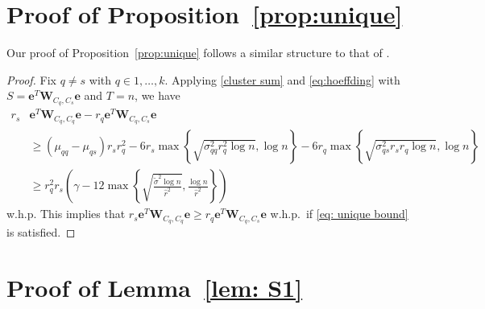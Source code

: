 \documentclass[twoside,11pt]{article}
\newcommand{\e}{\bs {e}}
\newcommand{\bs}{\boldsymbol}
\newcommand{\W}{\bs {W}}
\newcommand{\0}{\bs{0}}
\newcommand{\rbra}[1]{\ensuremath{\left( #1 \right)}} %
\newcommand{\bra}[1]{\ensuremath{\left\{ #1 \right\}}} %
\newcommand{\eq}[1]{\(#1\)}
\begin{document}
\section{Proof of Proposition~\ref{prop:unique}}
\label{A_unique}



Our proof of Proposition~\ref{prop:unique} follows a similar structure to that of \citet[Lemma~4.4]{ames2014guaranteed}.

\begin{proof}
	Fix \eq{q \neq s} with \eq{q \in 1, \dots, k}.
	Applying \eqref{cluster sum} and \eqref{eq:hoeffding}
	with $S = \e^T \W_{C_q, C_s} \e$ and $T = n$,
	we have
	\begin{align*}
		r_s &\e^T \W_{C_q, C_q} \e
		- r_q \e^T \W_{C_q, C_s} \e \\
		& \ge (\mu_{qq} - \mu_{qs}) r_s r_q^2
		- 6 r_s \max \bra{ \sqrt{ \sigma_{qq}^2 r_q^2 \log n}, \log n}
		- 6 r_q \max \bra{ \sqrt{\sigma_{qs}^2 r_s r_q \log n}, \log n} \\
		&\ge r_q^2 r_s \rbra{ \gamma - 12 \max \bra{ \sqrt{\frac{\tilde\sigma^2 \log n}{\hat r^2}}, \frac{\log n}{\hat r^2}} }
	\end{align*}
	w.h.p.
	This implies that $r_s \e^T \W_{C_q, C_q} \e \ge r_q \e^T \W_{C_q, C_s} \e$ w.h.p.~if \eqref{eq: unique bound} is satisfied.
\end{proof}




\section{Proof of  Lemma~\ref{lem: S1}} %
\label{A_S1_bound}
\end{document}
